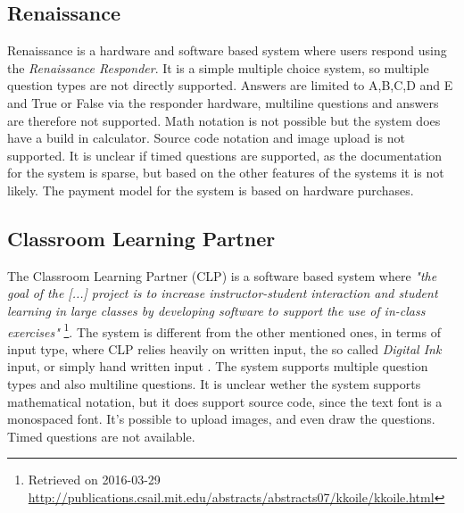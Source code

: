 \subsection*{Renaissance}
Renaissance is a hardware and software based system where users respond using the \emph{Renaissance Responder}. It is a simple multiple choice system, so multiple question types are not directly supported. Answers are limited to A,B,C,D and E and True or False via the responder hardware, multiline questions and answers are therefore not supported. Math notation is not possible but the system does have a build in calculator. Source code notation and image upload is not supported. It is unclear if timed questions are supported, as the documentation for the system is sparse, but based on the other features of the systems it is not likely. The payment model for the system is based on hardware purchases.

\subsection*{Classroom Learning Partner}
The Classroom Learning Partner (CLP) is a software based system where \emph{"the goal of the [...] project is to increase instructor-student interaction and student learning in large classes by developing software to support the use of in-class exercises"} \footnote{Retrieved on 2016-03-29 \url{http://publications.csail.mit.edu/abstracts/abstracts07/kkoile/kkoile.html}}. The system is different from the other mentioned ones, in terms of input type, where CLP relies heavily on written input, the so called \emph{Digital Ink} input, or simply hand written input \cite{koile2007supporting}. The system supports multiple question types and also multiline questions. It is unclear wether the system supports mathematical notation, but it does support source code, since the text font is a monospaced font. It's possible to upload images, and even draw the questions. Timed questions are not available. 






